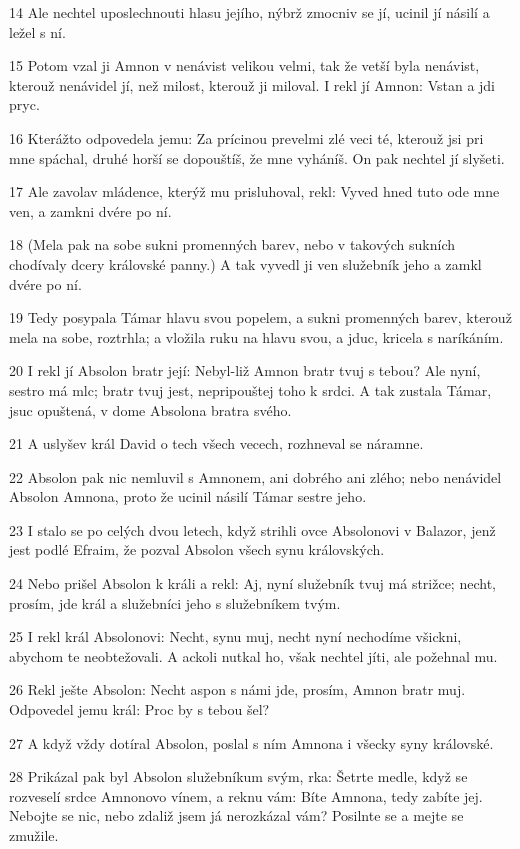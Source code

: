 \par 14 Ale nechtel uposlechnouti hlasu jejího, nýbrž zmocniv se jí, ucinil jí násilí a ležel s ní.
\par 15 Potom vzal ji Amnon v nenávist velikou velmi, tak že vetší byla nenávist, kterouž nenávidel jí, než milost, kterouž ji miloval. I rekl jí Amnon: Vstan a jdi pryc.
\par 16 Kterážto odpovedela jemu: Za prícinou prevelmi zlé veci té, kterouž jsi pri mne spáchal, druhé horší se dopouštíš, že mne vyháníš. On pak nechtel jí slyšeti.
\par 17 Ale zavolav mládence, kterýž mu prisluhoval, rekl: Vyved hned tuto ode mne ven, a zamkni dvére po ní.
\par 18 (Mela pak na sobe sukni promenných barev, nebo v takových sukních chodívaly dcery královské panny.) A tak vyvedl ji ven služebník jeho a zamkl dvére po ní.
\par 19 Tedy posypala Támar hlavu svou popelem, a sukni promenných barev, kterouž mela na sobe, roztrhla; a vložila ruku na hlavu svou, a jduc, kricela s naríkáním.
\par 20 I rekl jí Absolon bratr její: Nebyl-liž Amnon bratr tvuj s tebou? Ale nyní, sestro má mlc; bratr tvuj jest, nepripouštej toho k srdci. A tak zustala Támar, jsuc opuštená, v dome Absolona bratra svého.
\par 21 A uslyšev král David o tech všech vecech, rozhneval se náramne.
\par 22 Absolon pak nic nemluvil s Amnonem, ani dobrého ani zlého; nebo nenávidel Absolon Amnona, proto že ucinil násilí Támar sestre jeho.
\par 23 I stalo se po celých dvou letech, když strihli ovce Absolonovi v Balazor, jenž jest podlé Efraim, že pozval Absolon všech synu královských.
\par 24 Nebo prišel Absolon k králi a rekl: Aj, nyní služebník tvuj má strižce; necht, prosím, jde král a služebníci jeho s služebníkem tvým.
\par 25 I rekl král Absolonovi: Necht, synu muj, necht nyní nechodíme všickni, abychom te neobtežovali. A ackoli nutkal ho, však nechtel jíti, ale požehnal mu.
\par 26 Rekl ješte Absolon: Necht aspon s námi jde, prosím, Amnon bratr muj. Odpovedel jemu král: Proc by s tebou šel?
\par 27 A když vždy dotíral Absolon, poslal s ním Amnona i všecky syny královské.
\par 28 Prikázal pak byl Absolon služebníkum svým, rka: Šetrte medle, když se rozveselí srdce Amnonovo vínem, a reknu vám: Bíte Amnona, tedy zabíte jej. Nebojte se nic, nebo zdaliž jsem já nerozkázal vám? Posilnte se a mejte se zmužile.
